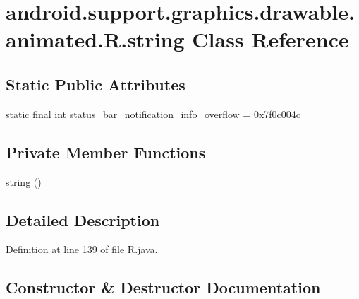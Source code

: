 \hypertarget{classandroid_1_1support_1_1graphics_1_1drawable_1_1animated_1_1_r_1_1string}{}\section{android.\+support.\+graphics.\+drawable.\+animated.\+R.\+string Class Reference}
\label{classandroid_1_1support_1_1graphics_1_1drawable_1_1animated_1_1_r_1_1string}
\subsection*{Static Public Attributes}
\begin{DoxyCompactItemize}
\item 
static final int \mbox{\hyperlink{classandroid_1_1support_1_1graphics_1_1drawable_1_1animated_1_1_r_1_1string_adb1e336cab06d5a619196b54c531a8fe}{status\+\_\+bar\+\_\+notification\+\_\+info\+\_\+overflow}} = 0x7f0c004c
\end{DoxyCompactItemize}
\subsection*{Private Member Functions}
\begin{DoxyCompactItemize}
\item 
\mbox{\hyperlink{classandroid_1_1support_1_1graphics_1_1drawable_1_1animated_1_1_r_1_1string_a6979d9a7a69f95bebb76b2bc8c047374}{string}} ()
\end{DoxyCompactItemize}


\subsection{Detailed Description}


Definition at line 139 of file R.\+java.



\subsection{Constructor \& Destructor Documentation}
\mbox{\label{classandroid_1_1support_1_1graphics_1_1drawable_1_1animated_1_1_r_1_1string_a6979d9a7a69f95bebb76b2bc8c047374}} 
